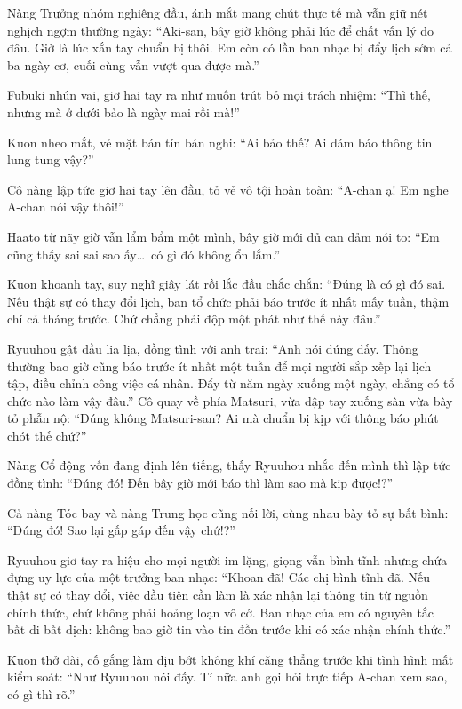 \documentclass[../main.tex]{subfiles}
\begin{document}
Nàng Trưởng nhóm nghiêng đầu, ánh mắt mang chút thực tế mà vẫn giữ nét nghịch ngợm thường ngày: ``Aki-san, bây giờ không phải lúc để chất vấn lý do đâu. Giờ là lúc xắn tay chuẩn bị thôi. Em còn có lần ban nhạc bị đẩy lịch sớm cả ba ngày cơ, cuối cùng vẫn vượt qua được mà.''

Fubuki nhún vai, giơ hai tay ra như muốn trút bỏ mọi trách nhiệm: ``Thì thế, nhưng mà ở dưới bảo là ngày mai rồi mà!''

Kuon nheo mắt, vẻ mặt bán tín bán nghi: ``Ai bảo thế? Ai dám báo thông tin lung tung vậy?''

Cô nàng lập tức giơ hai tay lên đầu, tỏ vẻ vô tội hoàn toàn: ``A-chan ạ! Em nghe A-chan nói vậy thôi!''

Haato từ nãy giờ vẫn lẩm bẩm một mình, bây giờ mới đủ can đảm nói to: ``Em cũng thấy sai sai sao ấy\dots\ có gì đó không ổn lắm.''

Kuon khoanh tay, suy nghĩ giây lát rồi lắc đầu chắc chắn: ``Đúng là có gì đó sai. Nếu thật sự có thay đổi lịch, ban tổ chức phải báo trước ít nhất mấy tuần, thậm chí cả tháng trước. Chứ chẳng phải độp một phát như thế này đâu.''

Ryuuhou gật đầu lia lịa, đồng tình với anh trai: ``Anh nói đúng đấy. Thông thường bao giờ cũng báo trước ít nhất một tuần để mọi người sắp xếp lại lịch tập, điều chỉnh công việc cá nhân. Đẩy từ năm ngày xuống một ngày, chẳng có tổ chức nào làm vậy đâu.'' Cô quay về phía Matsuri, vừa dập tay xuống sàn vừa bày tỏ phẫn nộ: ``Đúng không Matsuri-san? Ai mà chuẩn bị kịp với thông báo phút chót thế chứ?''

Nàng Cổ động vốn đang định lên tiếng, thấy Ryuuhou nhắc đến mình thì lập tức đồng tình: ``Đúng đó! Đến bây giờ mới báo thì làm sao mà kịp được!?''

Cả nàng Tóc bay và nàng Trung học cũng nối lời, cùng nhau bày tỏ sự bất bình: ``Đúng đó! Sao lại gấp gáp đến vậy chứ!?''

Ryuuhou giơ tay ra hiệu cho mọi người im lặng, giọng vẫn bình tĩnh nhưng chứa đựng uy lực của một trưởng ban nhạc: ``Khoan đã! Các chị bình tĩnh đã. Nếu thật sự có thay đổi, việc đầu tiên cần làm là xác nhận lại thông tin từ nguồn chính thức, chứ không phải hoảng loạn vô cớ. Ban nhạc của em có nguyên tắc bất di bất dịch: không bao giờ tin vào tin đồn trước khi có xác nhận chính thức.''

Kuon thở dài, cố gắng làm dịu bớt không khí căng thẳng trước khi tình hình mất kiểm soát: ``Như Ryuuhou nói đấy. Tí nữa anh gọi hỏi trực tiếp A-chan xem sao, có gì thì rõ.''
\end{document}
